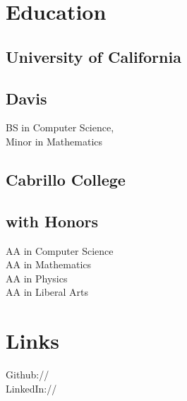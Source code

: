 \documentclass[]{deedy-resume-openfont}
\begin{document}
%
%



%
%

\begin{minipage}[t]{0.33\textwidth} 

\section{Education} 
\subsection{University of California}
\subsection{Davis}
{BS in Computer Science,\\ Minor in Mathematics}\\
\sectionsep

\subsection{Cabrillo College}
\subsection{with Honors} 
{AA in Computer Science}\\
{AA in Mathematics} \\
{AA in Physics} \\
{AA in Liberal Arts}\\


\sectionsep



\section{Links} 
Github:// \href{https://github.com/Frushtration}{} \\
LinkedIn://  \href{https://www.linkedin.com/in/cjfrush/}{} \\



\end{minipage}
\end{document}
